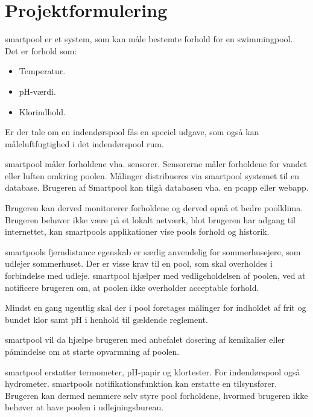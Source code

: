 \section{Projektformulering}\label{sec:projektformulering}

\gls{smartpool} er et system, som kan måle bestemte forhold for en swimmingpool. 
Det er forhold som:

\begin{itemize}
	\item Temperatur.
	\item pH-værdi.
	\item Klorindhold.
\end{itemize}

Er der tale om en indendørspool fås en speciel udgave, som også kan måleluftfugtighed i det indendørspool rum.

\gls{smartpool} måler forholdene vha. sensorer. Sensorerne måler forholdene for vandet eller luften omkring poolen. Målinger distribueres via \gls{smartpool} systemet til en database. Brugeren af Smartpool kan tilgå databasen vha. en \gls{pcapp} eller \gls{webapp}.

Brugeren kan derved monitorerer forholdene og derved opnå et bedre poolklima. Brugeren behøver ikke være på et lokalt netværk, blot brugeren har adgang til internettet, kan \glspl{smartpool} applikationer vise pools forhold og historik. 

\glspl{smartpool} fjerndistance egenskab er særlig anvendelig for sommerhusejere, som udlejer sommerhuset. Der er visse krav til en pool, som skal overholdes i forbindelse med udleje. \gls{smartpool} hjælper med vedligeholdelsen af poolen, ved at notificere brugeren om, at poolen ikke overholder acceptable forhold. 

Mindst en gang ugentlig skal der i pool foretages målinger for indholdet af frit og bundet klor samt pH i henhold til gældende reglement.

\gls{smartpool} vil da hjælpe brugeren med anbefalet dosering af kemikalier eller påmindelse om at starte opvarmning af poolen.

\gls{smartpool} erstatter termometer, pH-papir og klortester. For indendørspool også hydrometer. \glspl{smartpool} notifikationsfunktion kan erstatte en tilsynsfører. Brugeren kan dermed nemmere selv styre pool forholdene, hvormed brugeren ikke behøver at have poolen i udlejningsbureau.
